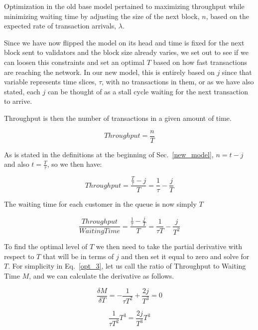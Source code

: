 \documentclass[conference]{IEEEtran}
\begin{document}
Optimization in the old base model pertained to maximizing throughput
while minimizing waiting time by adjusting the size of the next block, $n$,
based on the expected rate of transaction arrivals, $\lambda$. 

Since we have now flipped the model on its head and time is fixed for the next
block sent to validators and the block size already varies, we set out to see if
we can loosen this constraints and set an optimal $T$ based on how fast 
transactions are reaching the network. In our new model, this is entirely based
on $j$ since that variable represents time slices, $\tau$, with no transactions in them,
or as we have also stated, each $j$ can be thought of as a stall cycle waiting for
the next transaction to arrive.

Throughput is then the number of transactions in a given amount of time. 

\begin{equation}
  Throughput = \frac{n}{T}\label{opt_1}
\end{equation}

As is stated in the definitions at the beginning of Sec.~\ref{new_model},
$n=t-j$ and also $t = \frac{T}{\tau}$, so we then have:

\begin{equation}
  Throughput = \frac{\frac{T}{\tau}-j}{T}=\frac{1}{\tau}-\frac{j}{T}\label{opt_2}
\end{equation}

The waiting time for each customer in the queue is now simply $T$

\begin{equation}
  \frac{Throughput}{WaitingTime} = \frac{\frac{1}{\tau}-\frac{j}{T}}{T} = \frac{1}{\tau T}-\frac{j}{T^2}\label{opt_2}
\end{equation}

To find the optimal level of $T$ we then need to take the partial derivative with respect to $T$ that will
be in terms of $j$ and then set it equal to zero and solve for $T$. For simplicity in Eq.~\ref{opt_3}, 
let us call the ratio of Throughput to Waiting Time $M$, and we can calculate the derivative as follows.

\begin{equation}
  \frac{\delta M}{\delta T} = -\frac{1}{\tau T^2}+\frac{2j}{T^3}=0\label{opt_3}
\end{equation}

\begin{equation}
  \frac{1}{\tau T^2}T^3=\frac{2j}{T^3}T^3\label{opt_4}
\end{equation}
\end{document}

